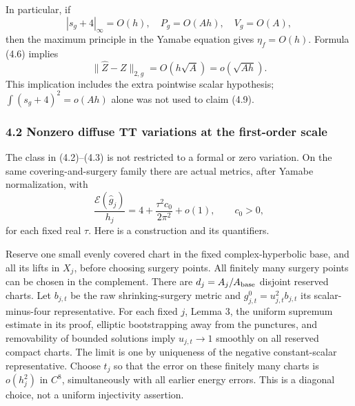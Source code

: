 \documentclass[
  11pt,
]{article}
\begin{document}
In particular, if \[
 |s_g+4|_\infty=O(h),\quad P_g=O(Ah),\quad V_g=O(A),
\] then the maximum principle in the Yamabe equation gives
\(\eta_f=O(h)\). Formula (4.6) implies \[
 \|\widehat Z-Z\|_{2,g}=O(h\sqrt A)=o(\sqrt{Ah}). \tag{4.9}
\] This implication includes the extra pointwise scalar hypothesis;
\(\int(s_g+4)^2=o(Ah)\) alone was not used to claim (4.9).

\hypertarget{nonzero-diffuse-tt-variations-at-the-first-order-scale}{%
\subsubsection{4.2 Nonzero diffuse TT variations at the first-order
scale}\label{nonzero-diffuse-tt-variations-at-the-first-order-scale}}

The class in (4.2)--(4.3) is not restricted to a formal or zero
variation. On the same covering-and-surgery family there are actual
metrics, after Yamabe normalization, with \[
 \boxed{\frac{\mathcal E(\widehat g_j)}{h_j}
       =4+\frac{\tau^2c_0}{2\pi^2}+o(1),\qquad c_0>0,} \tag{4.10}
\] for each fixed real \(\tau\). Here is a construction and its
quantifiers.

Reserve one small evenly covered chart in the fixed complex-hyperbolic
base, and all its lifts in \(X_j\), before choosing surgery points. All
finitely many surgery points can be chosen in the complement. There are
\(d_j=A_j/A_{\rm base}\) disjoint reserved charts. Let \(b_{j,t}\) be
the raw shrinking-surgery metric and \(g^0_{j,t}=u_{j,t}^2b_{j,t}\) its
scalar-minus-four representative. For each fixed \(j\), Lemma 3, the
uniform supremum estimate in its proof, elliptic bootstrapping away from
the punctures, and removability of bounded solutions imply
\(u_{j,t}\to1\) smoothly on all reserved compact charts. The limit is
one by uniqueness of the negative constant-scalar representative. Choose
\(t_j\) so that the error on these finitely many charts is \(o(h_j^2)\)
in \(C^8\), simultaneously with all earlier energy errors. This is a
diagonal choice, not a uniform injectivity assertion.
\end{document}
